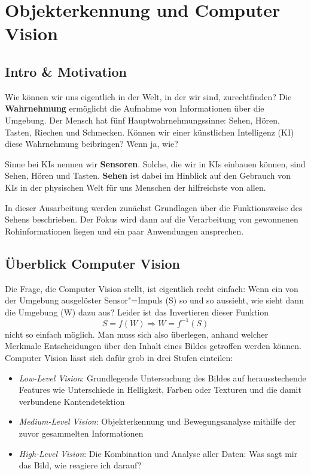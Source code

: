 \usetikzlibrary{calc}
\usetikzlibrary{positioning}
\usetikzlibrary{matrix}
\usetikzlibrary{mindmap,trees,shapes,snakes}


\chapter{Objekterkennung und Computer Vision}
\section{Intro \& Motivation}
Wie können wir uns eigentlich in der Welt, in der wir sind, zurechtfinden? Die \textbf{Wahrnehmung} ermöglicht die Aufnahme von Informationen über die Umgebung. Der Mensch hat fünf Hauptwahrnehmungssinne: Sehen, Hören, Tasten, Riechen und Schmecken. Können wir einer künstlichen Intelligenz (KI) diese Wahrnehmung beibringen? Wenn ja, wie?

Sinne bei KIs nennen wir \textbf{Sensoren}. Solche, die wir in KIs einbauen können, sind Sehen, Hören und Tasten. \textbf{Sehen} ist dabei im Hinblick auf den Gebrauch von KIs in der physischen Welt für uns Menschen der hilfreichste von allen.

In dieser Ausarbeitung werden zunächst Grundlagen über die Funktionsweise des Sehens beschrieben. Der Fokus wird dann auf die Verarbeitung von gewonnenen Rohinformationen liegen und ein paar Anwendungen ansprechen.

\section{Überblick Computer Vision}
Die Frage, die Computer Vision stellt, ist eigentlich recht einfach: Wenn ein von der Umgebung ausgelöster Sensor"=Impuls (S) so und so aussieht, wie sieht dann die Umgebung (W) dazu aus? Leider ist das Invertieren dieser Funktion
\begin{equation*}
S = f(W) \Rightarrow W = f^{-1}(S)
\end{equation*}
nicht so einfach möglich. Man muss sich also überlegen, anhand welcher Merkmale Entscheidungen über den Inhalt eines Bildes getroffen werden können. Computer Vision lässt sich dafür grob in drei Stufen einteilen:
\begin{itemize}
\item \textit{Low-Level Vision}: Grundlegende Untersuchung des Bildes auf herausstechende Features wie Unterschiede in Helligkeit, Farben oder Texturen und die damit verbundene Kantendetektion
\item \textit{Medium-Level Vision}: Objekterkennung und Bewegungsanalyse mithilfe der zuvor gesammelten Informationen
\item \textit{High-Level Vision}: Die Kombination und Analyse aller Daten: Was sagt mir das Bild, wie reagiere ich darauf?
\end{itemize}

